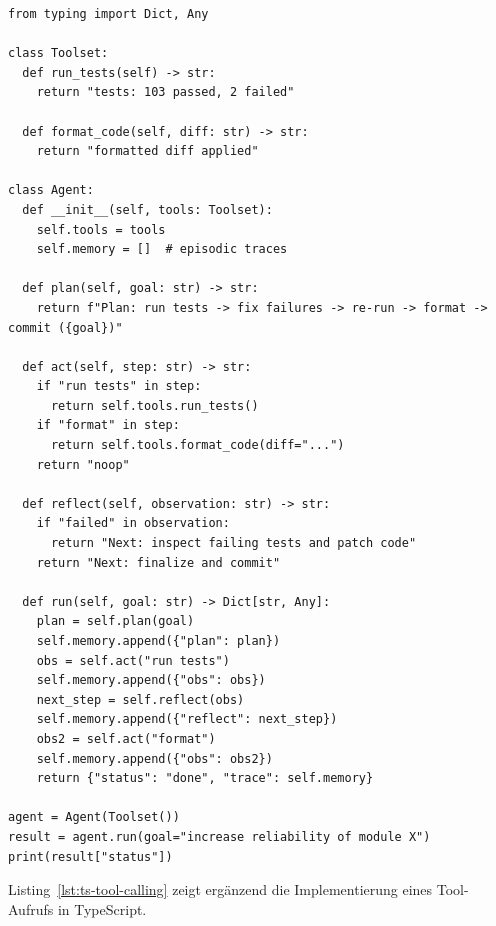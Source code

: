 \begin{lstlisting}[style=Python, caption={Minimaler agentischer Loop für SE-Aufgaben (Beispiel-Listing)}, label={lst:agent-loop}]
from typing import Dict, Any

class Toolset:
  def run_tests(self) -> str:
    return "tests: 103 passed, 2 failed"

  def format_code(self, diff: str) -> str:
    return "formatted diff applied"

class Agent:
  def __init__(self, tools: Toolset):
    self.tools = tools
    self.memory = []  # episodic traces

  def plan(self, goal: str) -> str:
    return f"Plan: run tests -> fix failures -> re-run -> format -> commit ({goal})"

  def act(self, step: str) -> str:
    if "run tests" in step:
      return self.tools.run_tests()
    if "format" in step:
      return self.tools.format_code(diff="...")
    return "noop"

  def reflect(self, observation: str) -> str:
    if "failed" in observation:
      return "Next: inspect failing tests and patch code"
    return "Next: finalize and commit"

  def run(self, goal: str) -> Dict[str, Any]:
    plan = self.plan(goal)
    self.memory.append({"plan": plan})
    obs = self.act("run tests")
    self.memory.append({"obs": obs})
    next_step = self.reflect(obs)
    self.memory.append({"reflect": next_step})
    obs2 = self.act("format")
    self.memory.append({"obs": obs2})
    return {"status": "done", "trace": self.memory}

agent = Agent(Toolset())
result = agent.run(goal="increase reliability of module X")
print(result["status"])
\end{lstlisting}

Listing~\ref{lst:ts-tool-calling} zeigt ergänzend die Implementierung eines Tool-Aufrufs in TypeScript.

